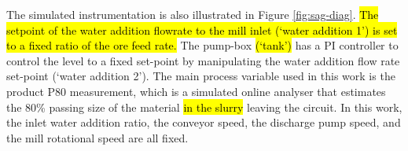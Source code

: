 {{The simulated instrumentation is also illustrated in Figure \ref{fig:sag-diag}. \hl{The setpoint of the water addition flowrate to the mill inlet (`water addition 1') is set to a fixed ratio of the ore feed rate.} The pump-box \hl{(`tank')} has a \gls{PI} controller to control the level to a fixed set-point by manipulating the water addition flow rate set-point (`water addition 2'). The main process variable used in this work is the product P80 measurement, which is a simulated online analyser that estimates the 80\% passing size of the material \hl{in the slurry} leaving the circuit. In this work, the inlet water addition ratio, the conveyor speed, the discharge pump speed, and the mill rotational speed are all fixed.

%
%
}}
